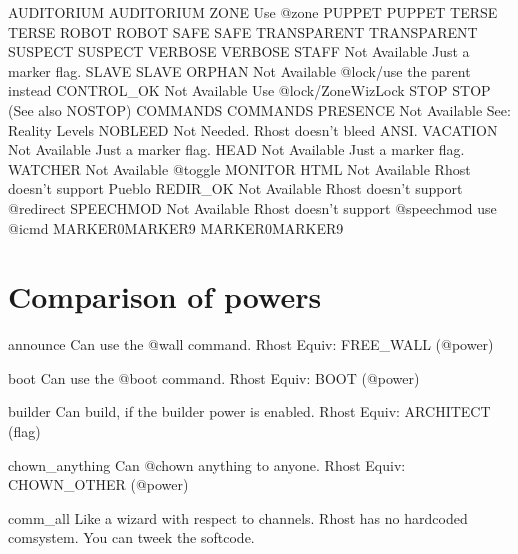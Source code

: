 \documentclass[letterpaper,10pt,english]{sphinxmanual}
\begin{document}
AUDITORIUM      \sphinxhyphen{} AUDITORIUM
ZONE            \sphinxhyphen{} Use @zone
PUPPET          \sphinxhyphen{} PUPPET
TERSE           \sphinxhyphen{} TERSE
ROBOT           \sphinxhyphen{} ROBOT
SAFE            \sphinxhyphen{} SAFE
TRANSPARENT     \sphinxhyphen{} TRANSPARENT
SUSPECT         \sphinxhyphen{} SUSPECT
VERBOSE         \sphinxhyphen{} VERBOSE
STAFF           \sphinxhyphen{} Not Available \sphinxhyphen{} Just a marker flag.
SLAVE           \sphinxhyphen{} SLAVE
ORPHAN          \sphinxhyphen{} Not Available \sphinxhyphen{} @lock/use the parent instead
CONTROL\_OK      \sphinxhyphen{} Not Available \sphinxhyphen{} Use @lock/ZoneWizLock
STOP            \sphinxhyphen{} STOP (See also NOSTOP)
COMMANDS        \sphinxhyphen{} COMMANDS
PRESENCE        \sphinxhyphen{} Not Available \sphinxhyphen{} See: Reality Levels
NOBLEED         \sphinxhyphen{} Not Needed.  Rhost doesn’t bleed ANSI.
VACATION        \sphinxhyphen{} Not Available \sphinxhyphen{} Just a marker flag.
HEAD            \sphinxhyphen{} Not Available \sphinxhyphen{} Just a marker flag.
WATCHER         \sphinxhyphen{} Not Available \sphinxhyphen{} @toggle MONITOR
HTML            \sphinxhyphen{} Not Available \sphinxhyphen{} Rhost doesn’t support Pueblo
REDIR\_OK        \sphinxhyphen{} Not Available \sphinxhyphen{} Rhost doesn’t support @redirect
SPEECHMOD       \sphinxhyphen{} Not Available \sphinxhyphen{} Rhost doesn’t support @speechmod \sphinxhyphen{} use @icmd
MARKER0\sphinxhyphen{}MARKER9 \sphinxhyphen{} MARKER0\sphinxhyphen{}MARKER9


\chapter{Comparison of powers}
\label{\detokenize{powers:comparison-of-powers}}\label{\detokenize{powers::doc}}
\sphinxAtStartPar
announce              Can use the @wall command.
Rhost Equiv: \sphinxhyphen{} FREE\_WALL (@power)

\sphinxAtStartPar
boot                  Can use the @boot command.
Rhost Equiv: BOOT (@power)

\sphinxAtStartPar
builder               Can build, if the builder power is enabled.
Rhost Equiv: ARCHITECT (flag)

\sphinxAtStartPar
chown\_anything        Can @chown anything to anyone.
Rhost Equiv: CHOWN\_OTHER (@power)

\sphinxAtStartPar
comm\_all              Like a wizard with respect to channels.
Rhost has no hardcoded comsystem.  You can tweek the softcode.
\end{document}
